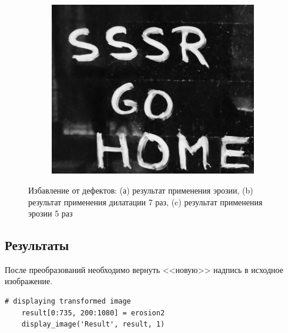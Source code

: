 \begin{figure}
\begin{subfigure}[b]{0.3\textwidth}
        \caption{}
        \label{img:Caption_dilation}
    \end{subfigure}
    \begin{subfigure}[b]{0.3\textwidth}
        \centering
        \includegraphics[width=\textwidth]{images/transformed_images/1/4 try/Erosed_2_5.jpg}
        \caption{}
        \label{img:Caption_erosed_2}
    \end{subfigure}
    \caption{Избавление от дефектов: (а) результат применения эрозии, (b)  результат применения дилатации 7 раз, (c)  результат применения эрозии 5 раз}
    \label{img:Transforms}
\end{figure}
\clearpage

\subsection{Результаты}

После преобразований необходимо вернуть <<новую>> надпись в исходное изображение.

\begin{lstlisting}[caption={Исходный код для получения итогового изображения}, label={lst:result}]
    # displaying transformed image
    result[0:735, 200:1080] = erosion2
    display_image('Result', result, 1)
\end{lstlisting}

